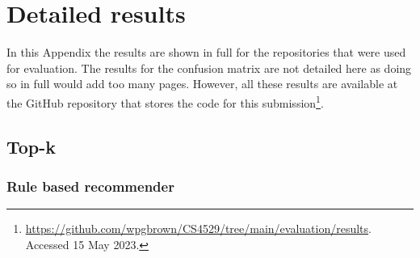 \chapter{Detailed results\label{appendix:detailed-results}}

\let\svaddcontentsline\addcontentsline
\renewcommand\addcontentsline[3]{%
  \edef\qtest{#1}%
  \def\qmatch{lof}%
  \ifx\qmatch\qtest\else%
    \def\qmatch{lot}%
    \ifx\qmatch\qtest\else%
      \svaddcontentsline{#1}{#2}{#3}%
  \fi\fi%
}

In this Appendix the results are shown in full for the repositories that were used for evaluation. The results for the confusion matrix are not detailed here as doing so in full would add too many pages. However, all these results are available at the GitHub repository that stores the code for this submission\footnote{\url{https://github.com/wpgbrown/CS4529/tree/main/evaluation/results}. Accessed 15 May 2023.}.

\section{Top-k}
\subsection{Rule based recommender}
